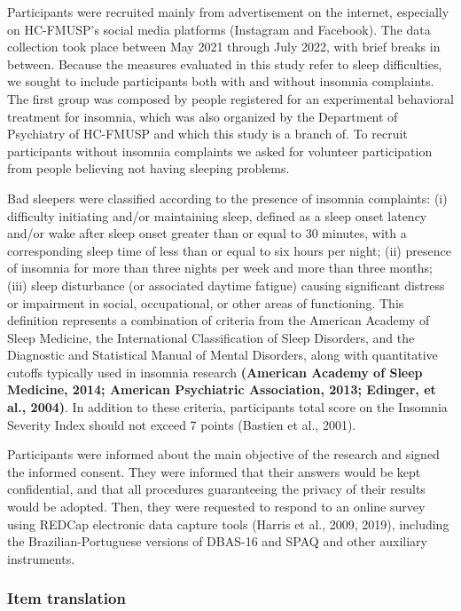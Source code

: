 \documentclass[
  ,doc,11pt, twoside,floatsintext]{apa6}
\begin{document}
Participants were recruited mainly from advertisement on the internet, especially on HC-FMUSP's social media platforms (Instagram and Facebook). The data collection took place between May 2021 through July 2022, with brief breaks in between. Because the measures evaluated in this study refer to sleep difficulties, we sought to include participants both with and without insomnia complaints. The first group was composed by people registered for an experimental behavioral treatment for insomnia, which was also organized by the Department of Psychiatry of HC-FMUSP and which this study is a branch of. To recruit participants without insomnia complaints we asked for volunteer participation from people believing not having sleeping problems.

Bad sleepers were classified according to the presence of insomnia complaints: (i) difficulty initiating and/or maintaining sleep, defined as a sleep onset latency and/or wake after sleep onset greater than or equal to 30 minutes, with a corresponding sleep time of less than or equal to six hours per night; (ii) presence of insomnia for more than three nights per week and more than three months; (iii) sleep disturbance (or associated daytime fatigue) causing significant distress or impairment in social, occupational, or other areas of functioning. This definition represents a combination of criteria from the American Academy of Sleep Medicine, the International Classification of Sleep Disorders, and the Diagnostic and Statistical Manual of Mental Disorders, along with quantitative cutoffs typically used in insomnia research \textbf{(American Academy of Sleep Medicine, 2014; American Psychiatric Association, 2013; Edinger, et al., 2004)}. In addition to these criteria, participants total score on the Insomnia Severity Index should not exceed 7 points (Bastien et al., 2001).

Participants were informed about the main objective of the research and signed the informed consent. They were informed that their answers would be kept confidential, and that all procedures
guaranteeing the privacy of their results would be adopted. Then, they were requested to respond to an online survey using REDCap electronic data capture tools (Harris et al., 2009, 2019), including the Brazilian-Portuguese versions of DBAS-16 and SPAQ and other auxiliary instruments.

\hypertarget{item-translation}{%
\subsubsection{Item translation}\label{item-translation}}
\end{document}
